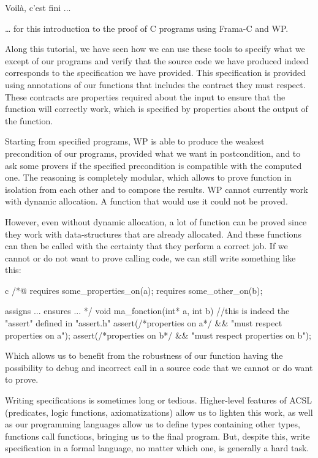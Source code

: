 \begin{Quotation}
Voilà, c'est fini ...
\end{Quotation}



\ldots{} for this introduction to the proof of C programs using Frama-C
and WP.

Along this tutorial, we have seen how we can use these tools to specify
what we except of our programs and verify that the source code we have
produced indeed corresponds to the specification we have provided. This
specification is provided using annotations of our functions that
includes the contract they must respect. These contracts are properties
required about the input to ensure that the function will correctly
work, which is specified by properties about the output of the function.

Starting from specified programs, WP is able to produce the weakest
precondition of our programs, provided what we want in postcondition,
and to ask some provers if the specified precondition is compatible with
the computed one. The reasoning is completely modular, which allows to
prove function in isolation from each other and to compose the results.
WP cannot currently work with dynamic allocation. A function that would
use it could not be proved.

However, even without dynamic allocation, a lot of function can be
proved since they work with data-structures that are already allocated.
And these functions can then be called with the certainty that they
perform a correct job. If we cannot or do not want to prove calling
code, we can still write something like this:



\begin{CodeBlock}{c}
/*@
  requires some_properties_on(a);
  requires some_other_on(b);

  assigns ...
  ensures ...
*/
void ma_fonction(int* a, int b){
  //this is indeed the  "assert" defined in "assert.h"
  assert(/*properties on a*/ && "must respect properties on a");  
  assert(/*properties on b*/ && "must respect properties on b");
}
\end{CodeBlock}



Which allows us to benefit from the robustness of our function having
the possibility to debug and incorrect call in a source code that we
cannot or do want to prove.

Writing specifications is sometimes long or tedious. Higher-level
features of ACSL (predicates, logic functions, axiomatizations) allow us
to lighten this work, as well as our programming languages allow us to
define types containing other types, functions call functions, bringing
us to the final program. But, despite this, write specification in a
formal language, no matter which one, is generally a hard task.

